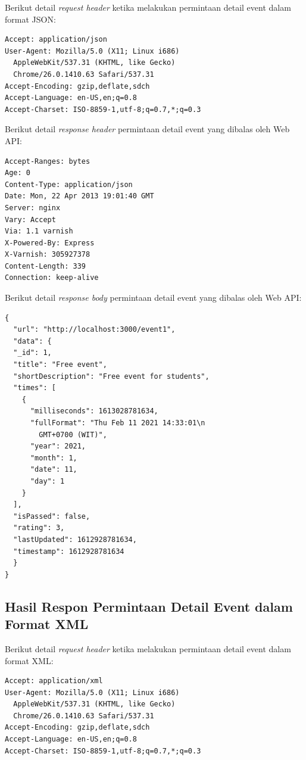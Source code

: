 \documentclass[a4paper, 12pt, oneside]{report}
\begin{document}
\onehalfspacing Berikut detail \textit{request header} ketika melakukan permintaan detail event dalam format JSON:

\begin{lstlisting}[frame=single]
Accept: application/json
User-Agent: Mozilla/5.0 (X11; Linux i686)
  AppleWebKit/537.31 (KHTML, like Gecko)
  Chrome/26.0.1410.63 Safari/537.31
Accept-Encoding: gzip,deflate,sdch
Accept-Language: en-US,en;q=0.8
Accept-Charset: ISO-8859-1,utf-8;q=0.7,*;q=0.3
\end{lstlisting}

Berikut detail \textit{response header} permintaan detail event yang dibalas oleh Web API:

\begin{lstlisting}[frame=single]
Accept-Ranges: bytes 
Age: 0 
Content-Type: application/json 
Date: Mon, 22 Apr 2013 19:01:40 GMT 
Server: nginx 
Vary: Accept 
Via: 1.1 varnish 
X-Powered-By: Express
X-Varnish: 305927378
Content-Length: 339 
Connection: keep-alive
\end{lstlisting}

Berikut detail \textit{response body} permintaan detail event yang dibalas oleh Web API:

\begin{lstlisting}[frame=single]
{
  "url": "http://localhost:3000/event1",
  "data": {
  "_id": 1,
  "title": "Free event",
  "shortDescription": "Free event for students",
  "times": [
    {
      "milliseconds": 1613028781634,
      "fullFormat": "Thu Feb 11 2021 14:33:01\n
        GMT+0700 (WIT)",
      "year": 2021,
      "month": 1,
      "date": 11,
      "day": 1
    }
  ],
  "isPassed": false,
  "rating": 3,
  "lastUpdated": 1612928781634,
  "timestamp": 1612928781634
  }
}
\end{lstlisting}

\subsection{Hasil Respon Permintaan Detail Event dalam Format XML}

Berikut detail \textit{request header} ketika melakukan permintaan detail event dalam format XML:

\begin{lstlisting}[frame=single]
Accept: application/xml
User-Agent: Mozilla/5.0 (X11; Linux i686)
  AppleWebKit/537.31 (KHTML, like Gecko)
  Chrome/26.0.1410.63 Safari/537.31
Accept-Encoding: gzip,deflate,sdch
Accept-Language: en-US,en;q=0.8
Accept-Charset: ISO-8859-1,utf-8;q=0.7,*;q=0.3
\end{lstlisting}
\end{document}

